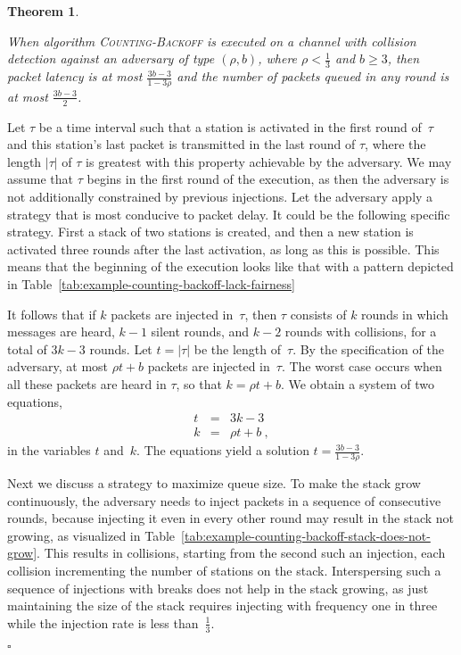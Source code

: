 \documentclass[11pt]{article}
\newcommand{\qed}{\hfill $\square$ \smallbreak}
\newenvironment{proof}{\noindent{\bf Proof:}}{\qed}
\newtheorem{theorem}{Theorem}
\begin{document}
\begin{theorem}
\label{thm:stack-with-collision-detection}

When algorithm \textsc{Counting-Backoff} is executed on a channel with collision detection against an adversary of type $(\rho,b)$, where $\rho<\frac{1}{3}$ and $b\ge 3$, then packet latency is at most $\frac{3b-3}{1-3\rho}$ and the number of packets queued in any round is at most $\frac{3b-3}{2}$.
\end{theorem}

\begin{proof} 
Let $\tau$ be a time interval such that a station is activated in the first round of~$\tau$ and this station's last packet is transmitted in the last round of $\tau$, where the length $|\tau|$ of $\tau$ is greatest with this property achievable by the adversary.
We may assume that $\tau$ begins in the first round of the execution, as then the adversary is not additionally constrained by previous injections.
Let the adversary apply a strategy that is most conducive to packet delay.
It could be the following specific strategy.
First a stack of two stations is created, and then a new station is activated  three rounds after the last activation, as long as this is possible.
This means that the beginning of the execution looks like that with a pattern depicted in Table~\ref{tab:example-counting-backoff-lack-fairness}

It follows that if $k$ packets are injected in~$\tau$, then $\tau$ consists of $k$ rounds in which  messages are heard, $k-1$ silent rounds, and $k-2$ rounds with collisions, for a total of $3k-3$ rounds.
Let $t=|\tau|$ be the length of~$\tau$.
By the specification of the adversary, at most $\rho t + b$ packets are injected in~$\tau$.
The worst case occurs when all these packets are heard in $\tau$, so that $k=\rho t + b$.
We obtain a system of two equations, 
\begin{eqnarray*}
t &=& 3k-3\\
k&=&\rho t + b\ , 
\end{eqnarray*}
in the variables $t$ and~$k$.
The equations yield a solution $t=\frac{3b-3}{1-3\rho}$.

Next we discuss a strategy to maximize queue size.
To make the stack grow continuously, the adversary needs to inject packets in a sequence of consecutive rounds, because injecting it even in every other round may result in the stack not growing, as visualized in Table~\ref{tab:example-counting-backoff-stack-does-not-grow}.
This results in collisions, starting from the second such an injection, each collision incrementing the number of stations on the stack.
Interspersing such a sequence of injections with breaks does not help in the stack growing, as just maintaining the size of the stack requires injecting with frequency one in three while the injection rate is less than~$\frac{1}{3}$.


\end{proof}
\end{document}
